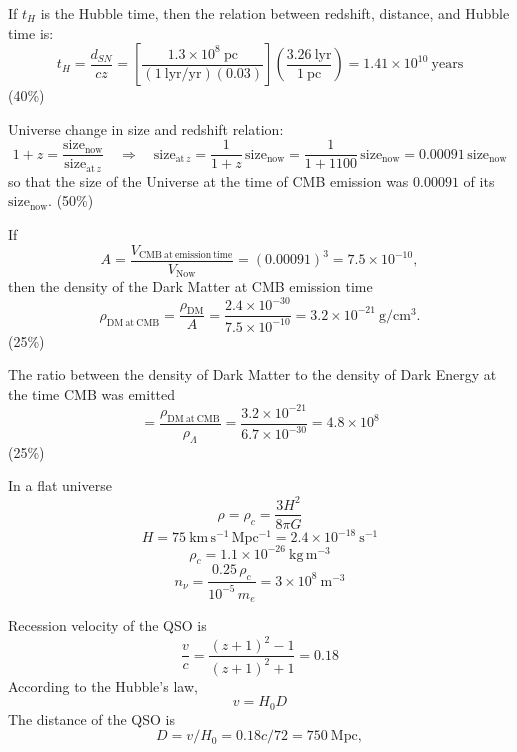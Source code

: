If $t_H$ is the Hubble time, then the relation between redshift, distance, and
Hubble time is:
\[
t_H = \frac{d_{SN}}{cz}
= \left[\frac{1.3\times10^{8}\ \mathrm{pc}}
  {(1\ \mathrm{lyr/yr})(0.03)}\right]
  \left(\frac{3.26\ \mathrm{lyr}}{1\ \mathrm{pc}}\right)
= 1.41\times10^{10}\ \mathrm{years}
\]
\hfill(40\%)

Universe change in size and redshift relation:
\[
1+z = \frac{\mathrm{size}_{\mathrm{now}}}{\mathrm{size}_{\mathrm{at}\,z}}
\quad\Longrightarrow\quad
\mathrm{size}_{\mathrm{at}\,z} = \frac{1}{1+z}\,\mathrm{size}_{\mathrm{now}}
= \frac{1}{1+1100}\,\mathrm{size}_{\mathrm{now}}
= 0.00091\,\mathrm{size}_{\mathrm{now}}
\]
so that the size of the Universe at the time of CMB emission was $0.00091$ of
its $\mathrm{size}_{\mathrm{now}}$.
\hfill(50\%)

If
\[
A = \frac{V_{\mathrm{CMB\ at\ emission\ time}}}{V_{\mathrm{Now}}}
= (0.00091)^3 = 7.5\times10^{-10},
\]
then the density of the Dark Matter at CMB emission time
\[
\rho_{\mathrm{DM\ at\ CMB}} = \frac{\rho_{\mathrm{DM}}}{A}
= \frac{2.4\times10^{-30}}{7.5\times10^{-10}}
= 3.2\times10^{-21}\ \mathrm{g/cm^3}.
\]
\hfill(25\%)

The ratio between the density of Dark Matter to the density of Dark Energy at
the time CMB was emitted
\[
= \frac{\rho_{\mathrm{DM\ at\ CMB}}}{\rho_{\Lambda}}
= \frac{3.2\times10^{-21}}{6.7\times10^{-30}} = 4.8\times10^{8}
\]
\hfill(25\%)

In a flat universe
\begin{equation*}
\rho = \rho_c = \frac{3H^2}{8\pi G} \tag*{(4 points)}
\end{equation*}
\begin{equation*}
H = 75~\mathrm{km\,s^{-1}\,Mpc^{-1}} = 2.4\times10^{-18}~\mathrm{s^{-1}}
\tag*{(2 points)}
\end{equation*}
\begin{equation*}
\rho_c = 1.1\times10^{-26}~\mathrm{kg\,m^{-3}} \tag*{(2 points)}
\end{equation*}
\begin{equation*}
n_\nu = \frac{0.25\,\rho_c}{10^{-5}\,m_e} = 3\times10^{8}~\mathrm{m^{-3}}
\tag*{(2 points)}
\end{equation*}

Recession velocity of the QSO is
\begin{equation*}
\frac{v}{c} = \frac{(z+1)^2 - 1}{(z+1)^2 + 1} = 0.18 \tag*{4}
\end{equation*}
According to the Hubble's law,
\begin{equation*}
v = H_0 D \tag*{2}
\end{equation*}
The distance of the QSO is
\begin{equation*}
D = v/H_0 = 0.18c/72 = 750~\mathrm{Mpc}, \tag*{4}
\end{equation*}

